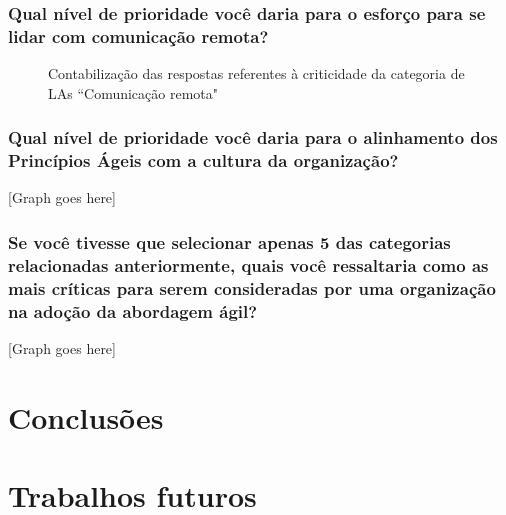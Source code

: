 \subsubsection{Qual nível de prioridade você daria para o esforço para se lidar com comunicação remota?}

\begin{figure}[H]
	\centering
	\captionsetup{justification=centering}
	\caption{Contabilização das respostas referentes à criticidade da categoria de LAs ``Comunicação remota"}
	\label{fig:result-remota}
\end{figure}

\subsubsection{Qual nível de prioridade você daria para o alinhamento dos Princípios Ágeis com a cultura da organização?}

[Graph goes here]

\subsubsection{Se você tivesse que selecionar apenas 5 das categorias relacionadas anteriormente, quais você ressaltaria como as mais críticas para serem consideradas por uma organização na adoção da abordagem ágil?}

[Graph goes here]

\section{Conclusões}


\section{Trabalhos futuros}

